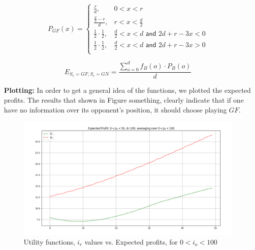 \documentclass[a4paper,10pt]{article}
\newcommand\rob{\ensuremath{r}\xspace}
\newcommand\opp{\ensuremath{o}\xspace}
\newcommand{\gn}{\ensuremath{GN}\xspace}
\newcommand{\gf}{\ensuremath{GF}\xspace}
\begin{document}
{\[P_\gf\left(x\right)=\begin{cases}
\frac{r}{d},&0<x<r\\
\frac{\frac{d}{2}-r}{d},&r<x<\frac{d}{2}\\
\frac{1}{2}\cdot \frac{1}{2},&\frac{d}{2}<x<d \textsf{ and } 2d+r-3x<0\\
\frac{1}{2}\cdot \frac{1}{2},&\frac{d}{2}<x<d \textsf{ and } 2d+r-3x>0\\
\end{cases}\]

\begin{equation}
E_{S_{\rob}=\gf,S_{\rob}=\gn}=\frac{\sum_{o=0}^{d}{f_{B}\left(o\right)\cdot P_{B}\left(o\right)}}{d}
\end{equation}

\textbf{Plotting:} In order to get a general idea of the functions, we plotted the expected profits. The results that shown in Figure something, clearly indicate that if one have no information over its opponent's position, it should choose playing $\gf$.

\begin{figure}[H]
\includegraphics[width=\textwidth]{Images/E1_E2_p2A_abs.png}
\caption{Utility functions, $i_{\rob}$ values vs. Expected profits, for $0<i_{\opp}<100$}
\end{figure}}
\end{document}
